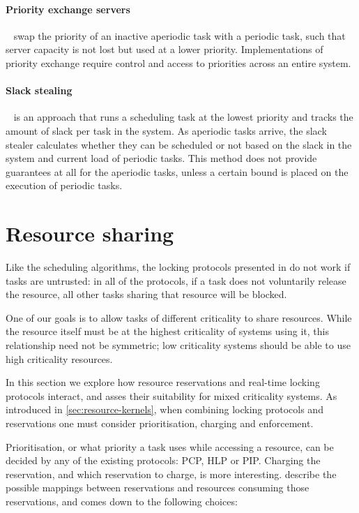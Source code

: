 \paragraph{Priority exchange servers}~\citep{Sprunt_SL_89a} swap the priority of an inactive
aperiodic task with a periodic task, such that server capacity is not lost but used at a lower
priority.  Implementations of priority exchange require control and access to priorities across an
entire system.

\paragraph{Slack stealing}~\citep{Ramos_Thuel_Lehoczky_93} is an approach that runs a scheduling
task at the lowest priority and tracks the amount of slack per task in the system.  As aperiodic
tasks arrive, the slack stealer calculates whether they can be scheduled or not based on the slack
in the system and current load of periodic tasks.  This method does not provide guarantees at all
for the aperiodic tasks, unless a certain bound is placed on the execution of periodic tasks.

\section{Resource sharing}

Like the scheduling algorithms, the locking protocols presented in  do not work if tasks are untrusted: in all of the protocols, if a task does not voluntarily release the resource, all other tasks sharing that resource will be blocked.

One of our goals is to allow tasks of different criticality to share resources. 
While the resource itself must be at the highest criticality of systems using it, this relationship need not be symmetric; low criticality systems should be able to use high criticality resources.

In this section we explore how resource reservations and real-time locking protocols interact, and asses their suitability for mixed criticality systems.
As introduced in \cref{sec:resource-kernels}, when combining locking protocols and reservations one must consider prioritisation, charging and enforcement.

Prioritisation, or what priority a task uses while accessing a resource, can be decided by any of the existing protocols: \gls{PCP}, \gls{HLP} or \gls{PIP}. 
Charging the reservation, and which reservation to charge, is more interesting. 
\citet{deNiz_LSR_01} describe the possible mappings between reservations and resources consuming those reservations, and comes down to the following choices:

